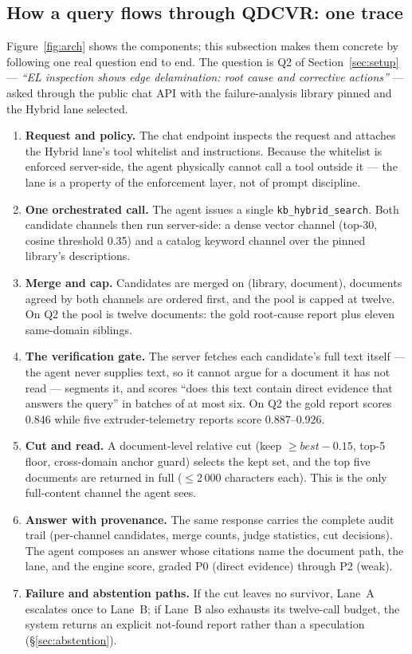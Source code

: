 \subsection{How a query flows through QDCVR: one trace}
\label{sec:trace}
Figure~\ref{fig:arch} shows the components; this subsection makes them
concrete by following one real question end to end. The question is Q2 of
Section~\ref{sec:setup} --- \emph{``EL inspection shows edge delamination:
root cause and corrective actions''} --- asked through the public chat API
with the failure-analysis library pinned and the Hybrid lane selected.

\begin{enumerate}
\item \textbf{Request and policy.} The chat endpoint inspects the request and
attaches the Hybrid lane's tool whitelist and instructions. Because the
whitelist is enforced server-side, the agent physically cannot call a tool
outside it --- the lane is a property of the enforcement layer, not of prompt
discipline.
\item \textbf{One orchestrated call.} The agent issues a single
\texttt{kb\_hybrid\_search}. Both candidate channels then run server-side: a
dense vector channel (top-30, cosine threshold 0.35) and a catalog keyword
channel over the pinned library's descriptions.
\item \textbf{Merge and cap.} Candidates are merged on (library, document),
documents agreed by both channels are ordered first, and the pool is capped at
twelve. On Q2 the pool is twelve documents: the gold root-cause report plus
eleven same-domain siblings.
\item \textbf{The verification gate.} The server fetches each candidate's full
text itself --- the agent never supplies text, so it cannot argue for a
document it has not read --- segments it, and scores ``does this text contain
direct evidence that answers the query'' in batches of at most six. On Q2 the
gold report scores 0.846 while five extruder-telemetry reports score
0.887--0.926.
\item \textbf{Cut and read.} A document-level relative cut (keep
$\geq \mathit{best}-0.15$, top-5 floor, cross-domain anchor guard) selects the
kept set, and the top five documents are returned in full ($\leq$2\,000
characters each). This is the only full-content channel the agent sees.
\item \textbf{Answer with provenance.} The same response carries the complete
audit trail (per-channel candidates, merge counts, judge statistics, cut
decisions). The agent composes an answer whose citations name the document
path, the lane, and the engine score, graded P0 (direct evidence) through P2
(weak).
\item \textbf{Failure and abstention paths.} If the cut leaves no survivor,
Lane~A escalates once to Lane~B; if Lane~B also exhausts its twelve-call
budget, the system returns an explicit not-found report rather than a
speculation (\S\ref{sec:abstention}).
\end{enumerate}

